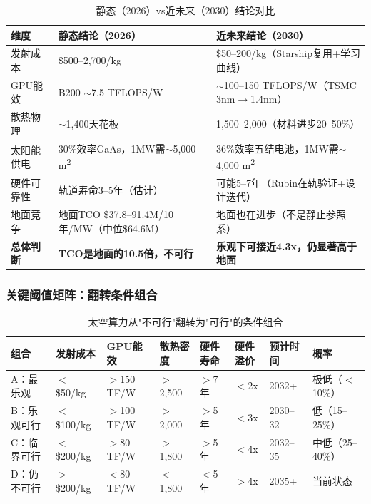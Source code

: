 \begin{table}[H]
\centering
\caption{静态（2026）vs近未来（2030）结论对比}
\label{tab:static_vs_future}
\small
\begin{tabular}{p{2.5cm}p{4.5cm}p{4.5cm}}
\toprule
\textbf{维度} & \textbf{静态结论（2026）} & \textbf{近未来结论（2030）} \\
\midrule
发射成本 & \$500--2,700/kg & \$50--200/kg（Starship复用+学习曲线） \\
GPU能效 & B200 $\sim$7.5 TFLOPS/W & $\sim$100--150 TFLOPS/W（TSMC 3nm$\rightarrow$1.4nm） \\
散热物理 & $\sim$1,400\unitWpm{}天花板 & 1,500--2,000\unitWpm{}（材料进步20--50\%） \\
太阳能供电 & 30\%效率GaAs，1MW需$\sim$5,000 m\textsuperscript{2} & 36\%效率五结电池，1MW需$\sim$4,000 m\textsuperscript{2} \\
硬件可靠性 & 轨道寿命3--5年（估计） & 可能5--7年（Rubin在轨验证+设计迭代） \\
地面竞争 & 地面TCO \$37.8--91.4M/10年/MW（中位\$64.6M） & 地面也在进步（不是静止参照系） \\
\rowcolor{gray!10}
\textbf{总体判断} & \textbf{TCO是地面的10.5倍，不可行} & \textbf{乐观下可接近4.3x，仍显著高于地面} \\
\bottomrule
\end{tabular}
\end{table}

\subsubsection{关键阈值矩阵：翻转条件组合}

\begin{table}[H]
\centering
\caption{太空算力从"不可行"翻转为"可行"的条件组合}
\label{tab:flip_matrix}
\footnotesize
\begin{tabular}{p{1.3cm}p{1.6cm}p{1.5cm}p{1.3cm}p{1.2cm}p{1.1cm}p{1.3cm}p{1.4cm}}
\toprule
\textbf{组合} & \textbf{发射成本} & \textbf{GPU能效} & \textbf{散热密度} & \textbf{硬件寿命} & \textbf{硬件溢价} & \textbf{预计时间} & \textbf{概率} \\
\midrule
A：最乐观 & $<$\$50/kg & $>$150 TF/W & $>$2,500 & $>$7年 & $<$2x & 2032+ & 极低（$<$10\%） \\
B：乐观可行 & $<$\$100/kg & $>$100 TF/W & $>$2,000 & $>$5年 & $<$3x & 2030--32 & 低（15--25\%） \\
C：临界可行 & $<$\$200/kg & $>$80 TF/W & $>$1,800 & $>$5年 & $<$4x & 2032--35 & 中低（25--40\%） \\
D：仍不可行 & $>$\$200/kg & $<$80 TF/W & $<$1,800 & $<$5年 & $>$4x & 2035+ & 当前状态 \\
\bottomrule
\end{tabular}
\end{table}

